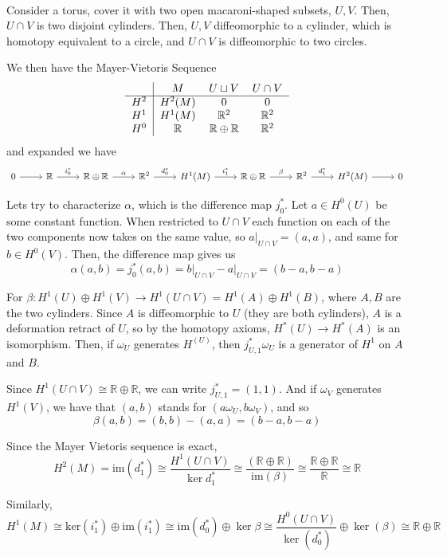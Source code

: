 \documentclass{article}
\begin{document}
\begin{example}
\



Consider a torus, cover it with two open macaroni-shaped subsets, $U, V$. Then, $U \cap V$ is two disjoint cylinders. Then, $U, V$ diffeomorphic to a cylinder, which is homotopy equivalent to a circle, and $U \cap V$ is diffeomorphic to two circles.

We then have the Mayer-Vietoris Sequence \[\begin{tabular}{c | c c c}
  & $M$ & $U \sqcup V$ & $U \cap V$\\
  \hline
  $H^2$ & $H^2(M)$ & $0$ & $0$\\
  $H^1$ & $H^1(M)$ & $ \mathbb{R}^2 $ & $\mathbb{R}^2$\\
  $H^0$ & $\mathbb{R}$ & $\mathbb{R} \oplus \mathbb{R}$ & $\mathbb{R}^2$
\end{tabular}\]and expanded we have \[\begin{tikzcd}
  0 & \mathbb{R} & \mathbb{R} \oplus \mathbb{R} & \mathbb{R}^2 & H^1(M) & \mathbb{R} \oplus \mathbb{R} & \mathbb{R}^2 & H^2(M) & 0
  \arrow[from=1-1, to=1-2]
  \arrow[from=1-2, to=1-3, "i^*_0"]
  \arrow[from=1-3, to=1-4, "\alpha"]
  \arrow[from=1-4, to=1-5, "d^*_0"]
  \arrow[from=1-5, to=1-6, "i^*_1"]
  \arrow[from=1-6, to=1-7, "\beta"]
  \arrow[from=1-7, to=1-8, "d_1^*"]
  \arrow[from=1-8, to=1-9]
\end{tikzcd}\]

Lets try to characterize $\alpha$, which is the difference map $j^*_0$. Let $a \in H^0(U)$ be some constant function. When restricted to $U \cap V$ each function on each of the two components now takes on the same value, so $a \vert_{U \cap V} = (a,a)$, and same for $b \in H^0(V)$. Then, the difference map gives us $$\alpha(a,b) = j^*_0(a,b) = b\vert_{U \cap V} - a\vert_{U \cap V} = (b-a, b-a)$$

For $\beta: H^1(U) \oplus H^1(V) \to H^1(U \cap V) = H^1(A) \oplus H^1(B)$, where $A, B$ are the two cylinders. Since $A$ is diffeomorphic to $U$ (they are both cylinders), $A$ is a deformation retract of $U$, so by the homotopy axioms, $H^*(U) \to H^*(A)$ is an isomorphism. Then, if $\omega_U$ generates $H^(U)$, then $j^*_{U, 1} \omega_U$ is a generator of $H^1$ on $A$ and $B$.

Since $H^1(U \cap V) \cong \mathbb{R} \oplus \mathbb{R}$, we can write $j^*_{U, 1} = (1,1)$. And if $\omega_V$ generates $H^1(V)$, we have that $(a,b)$ stands for $(a \omega_U, b \omega_V)$, and so $$\beta(a,b) = (b,b) - (a,a) = (b-a, b-a)$$


Since the Mayer Vietoris sequence is exact, $$H^2(M) = \text{im}(d_1^*) \cong \frac{H^1(U \cap V)}{\ker d_1^*} \cong \frac{(\mathbb{R} \oplus \mathbb{R})}{\text{im}(\beta)} \cong \frac{\mathbb{R} \oplus \mathbb{R}}{\mathbb{R}} \cong \mathbb{R}$$

Similarly, $$H^1(M) \cong \text{ker}(i^*_1) \oplus \text{im}(i_1^*) \cong \text{im}(d_0^*) \oplus \ker \beta \cong \frac{H^0(U \cap V)}{\ker (d_0^*)} \oplus \ker(\beta) \cong \mathbb{R} \oplus \mathbb{R}$$
\end{example}
\end{document}
